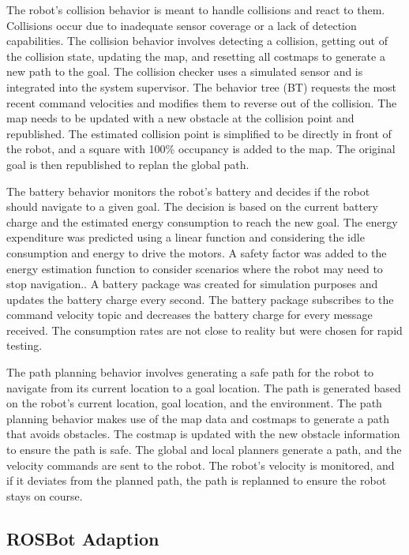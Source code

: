 \documentclass[letterpaper, 10pt, conference]{ieeeconf}
\begin{document}
The robot's collision behavior is meant to handle collisions and react to them. Collisions occur due to inadequate sensor coverage or a lack of detection capabilities. The collision behavior involves detecting a collision, getting out of the collision state, updating the map, and resetting all costmaps to generate a new path to the goal. The collision checker uses a simulated sensor and is integrated into the system supervisor. The behavior tree (BT) requests the most recent command velocities and modifies them to reverse out of the collision. The map needs to be updated with a new obstacle at the collision point and republished. The estimated collision point is simplified to be directly in front of the robot, and a square with 100\% occupancy is added to the map. The original goal is then republished to replan the global path.

The battery behavior monitors the robot's battery and decides if the robot should navigate to a given goal. The decision is based on the current battery charge and the estimated energy consumption to reach the new goal. The energy expenditure was predicted using a linear function and considering the idle consumption and energy to drive the motors. A safety factor was added to the energy estimation function to consider scenarios where the robot may need to stop navigation.. A battery package was created for simulation purposes and updates the battery charge every second. The battery package subscribes to the command velocity topic and decreases the battery charge for every message received. The consumption rates are not close to reality but were chosen for rapid testing.

The path planning behavior involves generating a safe path for the robot to navigate from its current location to a goal location. The path is generated based on the robot's current location, goal location, and the environment. The path planning behavior makes use of the map data and costmaps to generate a path that avoids obstacles. The costmap is updated with the new obstacle information to ensure the path is safe. The global and local planners generate a path, and the velocity commands are sent to the robot. The robot's velocity is monitored, and if it deviates from the planned path, the path is replanned to ensure the robot stays on course.

\subsection{ROSBot Adaption}
   
\end{document}
